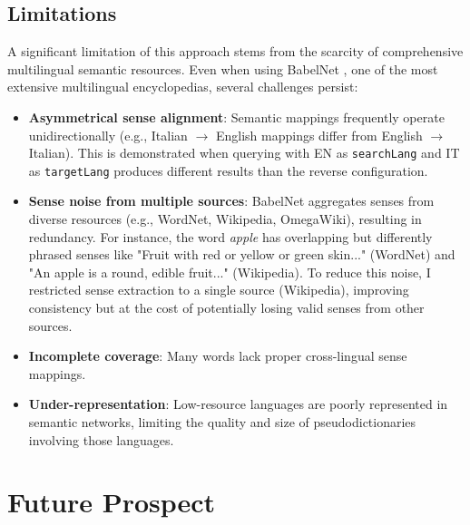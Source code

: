 \documentclass[runningheads]{llncs}
\begin{document}
\subsection{Limitations}

A significant limitation of this approach stems from the scarcity of comprehensive multilingual semantic resources. Even when using BabelNet \cite{BabelNet2012}, one of the most extensive multilingual encyclopedias, several challenges persist:

\begin{itemize}
\item \textbf{Asymmetrical sense alignment}: Semantic mappings frequently operate unidirectionally (e.g., Italian $\rightarrow$ English mappings differ from English $\rightarrow$ Italian). This is demonstrated when querying with EN as \texttt{searchLang} and IT as \texttt{targetLang} produces different results than the reverse configuration.
\item \textbf{Sense noise from multiple sources}: BabelNet aggregates senses from diverse resources (e.g., WordNet, Wikipedia, OmegaWiki), resulting in redundancy. For instance, the word \textit{apple} has overlapping but differently phrased senses like "Fruit with red or yellow or green skin..." (WordNet) and "An apple is a round, edible fruit..." (Wikipedia). To reduce this noise, I restricted sense extraction to a single source (Wikipedia), improving consistency but at the cost of potentially losing valid senses from other sources.
\item \textbf{Incomplete coverage}: Many words lack proper cross-lingual sense mappings.
\item \textbf{Under-representation}: Low-resource languages are poorly represented in semantic networks, limiting the quality and size of pseudodictionaries involving those languages.
\end{itemize}


\section{Future Prospect}
\end{document}
